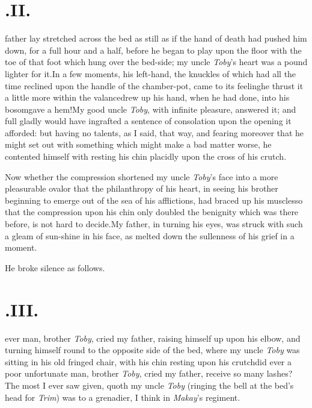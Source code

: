 \documentclass{article}
\begin{document}
\section{.\enspace II.}

 father lay stretched across the
bed as still as if the hand of death had pushed him down, for a
full hour and a half, before he began to play upon the floor
with the toe of that foot which hung over the bed-side; my uncle
\textit{Toby}’s heart was a pound lighter for
it.\tsh In a few moments, his left-hand, the knuckles of
which had all the time reclined upon the handle of the chamber-pot,
came to its feeling\tsk he thrust it a little more within the
valance\tsk drew up his hand, when he had done, into his
bosom\tsk gave a hem!\tsk My good uncle \textit{Toby}, with infinite
pleasure, answered it; and full gladly would have ingrafted a
sentence of consolation upon the opening it afforded: but having no
talents, as I said, that way, and fearing moreover that he might
set out with something which might make a bad matter worse, he
contented himself with resting his chin placidly upon the cross of
his crutch.

Now whether the compression shortened my uncle
\textit{Toby}’s face into a more pleasurable oval\tsk or that
the philanthropy of his heart, in seeing his brother beginning to
emerge out of the sea of his afflictions, had braced up his
muscles\tsh so that the compression upon his chin only
doubled the benignity which was there before, is not hard to
decide.\tsk My father, in turning his eyes, was struck
with such a gleam of sun-shine in his face, as melted down the
sullenness of his grief in a moment.

He broke silence as follows.

\section{.\enspace III.}

 ever man, brother \textit{Toby}, cried\break
my father, raising himself up upon\break
his elbow, and turning himself round to the opposite side of
the bed, where my uncle \textit{Toby} was sitting in his old
fringed chair, with his chin resting upon his\break
crutch\tsk did ever a poor unfortunate man, brother
\textit{Toby}, cried my father, receive so many lashes?\tsh
The most I ever saw given, quoth my uncle \textit{Toby}
(ringing the bell at the bed’s head for \textit{Trim})
was to a grenadier, I think in \textit{Makay}’s regiment.
\end{document}
